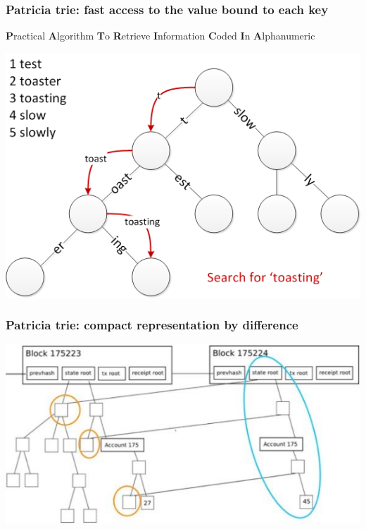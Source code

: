 \documentclass[11pt]{beamer}  %
\begin{document}
\begin{frame}\frametitle{Patricia trie: fast access to the value bound to each key}

  \begin{center}
    \textbf{P}ractical \textbf{A}lgorithm \textbf{T}o \textbf{R}etrieve \textbf{I}nformation \textbf{C}oded \textbf{I}n \textbf{A}lphanumeric
  \end{center}

  \begin{center}
    \includegraphics[scale=0.5,clip=false]{pictures/trie_search.png}
  \end{center}

\end{frame}

\begin{frame}\frametitle{Patricia trie: compact representation by difference}

  \begin{center}
    \includegraphics[scale=0.4,clip=false]{pictures/trie-update.jpg}
  \end{center}

\end{frame}
\end{document}

